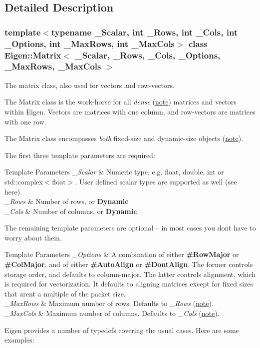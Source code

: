 \subsection{Detailed Description}
\subsubsection*{template$<$typename \+\_\+\+Scalar, int \+\_\+\+Rows, int \+\_\+\+Cols, int \+\_\+\+Options, int \+\_\+\+Max\+Rows, int \+\_\+\+Max\+Cols$>$\newline
class Eigen\+::\+Matrix$<$ \+\_\+\+Scalar, \+\_\+\+Rows, \+\_\+\+Cols, \+\_\+\+Options, \+\_\+\+Max\+Rows, \+\_\+\+Max\+Cols $>$}

The matrix class, also used for vectors and row-\/vectors. 

The Matrix class is the work-\/horse for all {\itshape dense} (\mbox{\hyperlink{class_eigen_1_1_matrix_dense}{note}}) matrices and vectors within Eigen. Vectors are matrices with one column, and row-\/vectors are matrices with one row.

The Matrix class encompasses {\itshape both} fixed-\/size and dynamic-\/size objects (\mbox{\hyperlink{class_eigen_1_1_matrix_fixedsize}{note}}).

The first three template parameters are required\+: 
\begin{DoxyTemplParams}{Template Parameters}
{\em \+\_\+\+Scalar} & Numeric type, e.\+g. float, double, int or std\+::complex$<$float$>$. User defined scalar types are supported as well (see here). \\
\hline
{\em \+\_\+\+Rows} & Number of rows, or {\bfseries{Dynamic}} \\
\hline
{\em \+\_\+\+Cols} & Number of columns, or {\bfseries{Dynamic}} \\
\hline
\end{DoxyTemplParams}
The remaining template parameters are optional -- in most cases you don\textquotesingle{}t have to worry about them. 
\begin{DoxyTemplParams}{Template Parameters}
{\em \+\_\+\+Options} & A combination of either {\bfseries{\#\+Row\+Major}} or {\bfseries{\#\+Col\+Major}}, and of either {\bfseries{\#\+Auto\+Align}} or {\bfseries{\#\+Dont\+Align}}. The former controls storage order, and defaults to column-\/major. The latter controls alignment, which is required for vectorization. It defaults to aligning matrices except for fixed sizes that aren\textquotesingle{}t a multiple of the packet size. \\
\hline
{\em \+\_\+\+Max\+Rows} & Maximum number of rows. Defaults to {\itshape \+\_\+\+Rows} (\mbox{\hyperlink{class_eigen_1_1_matrix_maxrows}{note}}). \\
\hline
{\em \+\_\+\+Max\+Cols} & Maximum number of columns. Defaults to {\itshape \+\_\+\+Cols} (\mbox{\hyperlink{class_eigen_1_1_matrix_maxrows}{note}}).\\
\hline
\end{DoxyTemplParams}
Eigen provides a number of typedefs covering the usual cases. Here are some examples\+:

